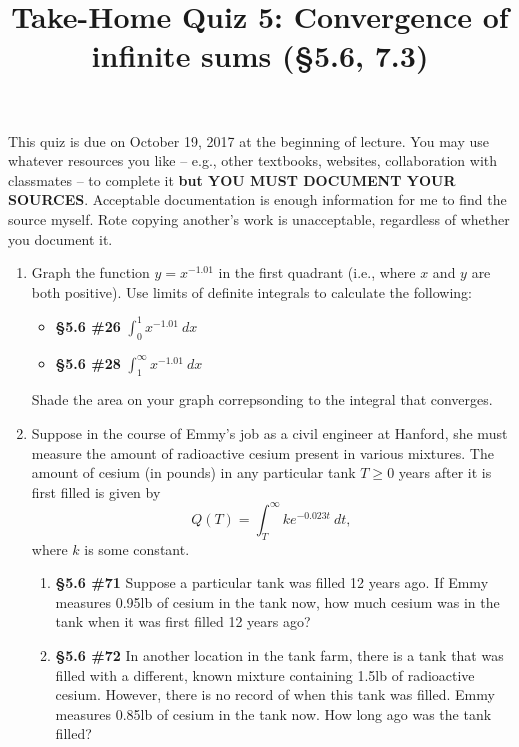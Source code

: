\documentclass[%
]{article}
\title{\vspace{-3.5pc} 
	\flushleft \bf \Large Take-Home Quiz 5: Convergence of infinite sums %
	 (\S5.6, 7.3)}
\date{}
\begin{document}
\maketitle

\vspace{-3pc}
 This quiz is due on October 19, 2017 at the beginning of lecture.  You may use whatever resources you like -- e.g., other textbooks, websites, collaboration with classmates -- to complete it \textbf{but YOU MUST DOCUMENT YOUR SOURCES}.  Acceptable documentation is enough information for me to find the source myself.  Rote copying another's work is unacceptable, regardless of whether you document it.  

\noindent\hrulefill

\begin{enumerate}
\item Graph the function $y=x^{-1.01}$ in the first quadrant (i.e., where $x$ and $y$ are both positive).  Use limits of definite integrals to calculate the following:
	\begin{itemize}
	\item {\bf \S5.6 \#26} $\displaystyle \int_0^1 x^{-1.01}\ dx$
	\item {\bf \S5.6 \#28} $\displaystyle \int_1^{\infty} x^{-1.01}\ dx$
	\end{itemize}
	Shade the area on your graph correpsonding to the integral that converges.

\item Suppose in the course of Emmy's job as a civil engineer at Hanford, she must measure the amount of radioactive cesium present in various mixtures.  The amount of cesium (in pounds) in any particular tank $T\geq 0$ years after it is first filled is given by  
\[
Q(T)=\int_T^{\infty}ke^{-0.023t}\ dt,
\]
where $k$ is some constant.
	\begin{enumerate}
	\item {\bf \S5.6 \#71}  Suppose a particular tank was filled 12 years ago.  If Emmy measures 0.95lb of cesium in the tank now, how much cesium was in the tank when it was first filled 12 years ago? 
	\item {\bf \S5.6 \#72} In another location in the tank farm, there is a tank that was filled with a different, known mixture containing 1.5lb of radioactive cesium.  However, there is no record of when this tank was filled.  Emmy measures 0.85lb of cesium in the tank now.   How long ago was the tank filled?
	\end{enumerate} 
 

\end{enumerate}
\end{document}
